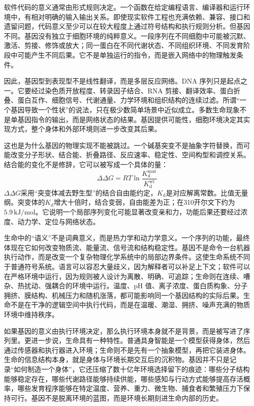 软件代码的意义通常由形式规则决定。一个函数在给定编程语言、编译器和运行环境中，有相对明确的输入输出关系。即使现实软件工程也充满依赖、兼容、接口和遗留问题，代码意义至少可以在较大程度上通过符号结构和执行规则分析。但基因不同。基因没有独立于细胞环境的纯粹意义。一段序列在不同细胞中可能被沉默、激活、剪接、修饰或放大；同一蛋白在不同代谢状态、不同组织环境、不同发育阶段中可能产生不同后果。它不是单独运行的指令，而是嵌入网络中的物理触发条件。

因此，基因型到表现型不是线性翻译，而是多层反应网络。DNA 序列只是起点之一。它要经过染色质开放程度、转录因子结合、RNA 剪接、翻译效率、蛋白折叠、蛋白互作、细胞信号、代谢通量、力学环境和组织结构的连续过滤。所谓“一个基因导致一个性状”的说法，只在极少数简单场景中近似成立\cite{manolio2009finding}。多数生命现象不是单基因指令的输出，而是网络状态的结果。基因提供可能性，细胞环境决定其实现方式，整个身体和外部环境则进一步改变其后果。

这也是为什么基因的物理实现不能被跳过。一个碱基突变不是抽象字符替换，而可能改变分子形状、结合能、折叠路径、反应速率、稳定性、空间构型和调控关系。结合能的变化不是修辞，它可以被写成一个具体的量：
\begin{equation}
\Delta\Delta G=RT\ln\frac{K_{\text{d}}^{\text{mut}}}{K_{\text{d}}^{\text{wt}}}
\label{eq:ch27-ddG}
\end{equation}
$\Delta\Delta G$采用“突变体减去野生型”的结合自由能约定，$K_{\mathrm d}$是对应解离常数。比值无量纲。突变体的$K_{\mathrm d}$增大十倍时，结合变弱，自由能差为正；在310开尔文下约为$5.9\,\mathrm{kJ/mol}$。它说明一个局部序列变化可能显著改变亲和力，功能后果还要经过浓度、动力学、定位与网络状态。

生命中的“语义”不是词典意义，而是热力学和动力学意义。一个序列的功能，最终体现在它如何改变物质流、能量流、信号流和结构稳定性。基因不是命令一台机器执行动作，而是改变一个复杂物理化学系统中的局部边界条件。这使生命系统不同于普通符号系统。语言可以容忍大量歧义，因为解释者可以补足上下文；软件可以在严格环境中运行，因为规则被人设计为离散、明确、可追踪；生命则在连续、嘈杂、热扰动、强耦合的环境中运行。温度、pH 值、离子浓度、蛋白质构象、分子拥挤、膜结构、机械压力和随机涨落\cite{ellis2001macromolecular}，都可能影响同一个基因结构的实际后果。生命不是在干净的逻辑空间中执行代码，而是在温暖、潮湿、拥挤、噪声充满的物质环境中维持秩序。


如果基因的意义由执行环境决定，那么执行环境本身就不是背景，而是被写进了序列里。更进一步说，生命具有一种特性。普通具身智能是一个模型获得身体，然后通过传感器和执行器进入环境；生命则不是先有一个抽象模型，再把它装进身体。生命的信息结构本身，就是身体与环境长期交互后的沉积物。基因并不只是记录“如何制造一个身体”，它还压缩了数十亿年环境选择留下的痕迹：哪些分子结构能够稳定存在，哪些代谢路径能够持续供能，哪些感知与行动方式能够提高存活概率，哪些发育程序能够在特定温度、营养、重力、微生物、捕食者和繁殖压力下保持可行。基因不是脱离环境的蓝图，而是环境长期刻进生命内部的历史。

